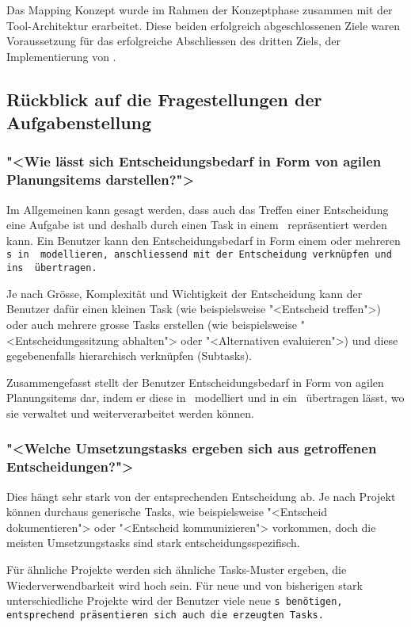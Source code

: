		Das Mapping Konzept wurde im Rahmen der Konzeptphase zusammen mit der Tool-Architektur erarbeitet. 
		Diese beiden erfolgreich abgeschlossenen Ziele waren Voraussetzung für das erfolgreiche Abschliessen des dritten Ziels, 
		der Implementierung von \eeppi.
				
		
	
	\subsection{Rückblick auf die Fragestellungen der Aufgabenstellung}
		\subsubsection{"<Wie lässt sich Entscheidungsbedarf in Form von agilen Planungsitems darstellen?">}
			Im Allgemeinen kann gesagt werden,
			dass auch das Treffen einer Entscheidung eine Aufgabe ist
			und deshalb durch einen Task in einem \ppt\ repräsentiert werden kann.
			Ein Benutzer kann den Entscheidungsbedarf in Form einem oder mehreren \tt s in \eeppi\ modellieren,  
			anschliessend mit der Entscheidung verknüpfen und ins \ppt\ übertragen.
			
			Je nach Grösse, Komplexität und Wichtigkeit der Entscheidung kann der Benutzer dafür einen kleinen Task (wie beispielsweise "<Entscheid treffen">) oder auch mehrere grosse Tasks erstellen (wie beispielsweise "<Entscheidungssitzung abhalten"> oder "<Alternativen evaluieren">) und diese gegebenenfalls hierarchisch verknüpfen (Subtasks).			
			
			Zusammengefasst stellt der Benutzer Entscheidungsbedarf in Form von agilen Planungsitems dar, indem er diese in \eeppi\ modelliert und in ein \ppt\ übertragen lässt, wo sie verwaltet und weiterverarbeitet werden können.


		\subsubsection{"<Welche Umsetzungstasks ergeben sich aus getroffenen Entscheidungen?">}
			Dies hängt sehr stark von der entsprechenden Entscheidung ab.
			Je nach Projekt können durchaus generische Tasks, wie beispielsweise "<Entscheid dokumentieren"> oder "<Entscheid kommunizieren"> vorkommen,
			doch die meisten Umsetzungstasks sind stark ent\-schei\-dungs\-spezifisch.
			
			Für ähnliche Projekte werden sich ähnliche Tasks-Muster ergeben, die Wiederverwendbarkeit wird hoch sein.
			Für neue und von bisherigen stark unterschiedliche Projekte wird der Benutzer viele neue \tt s benötigen, 
			entsprechend präsentieren sich auch die erzeugten Tasks.
			
